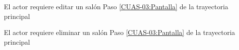 \UCExtensionPoint
{El actor requiere editar un salón}
{ Paso \ref{CUAS-03:Pantalla} de la trayectoria principal}
{}

\UCExtensionPoint
{El actor requiere eliminar un salón}
{ Paso \ref{CUAS-03:Pantalla} de la trayectoria principal}
{}
%
 